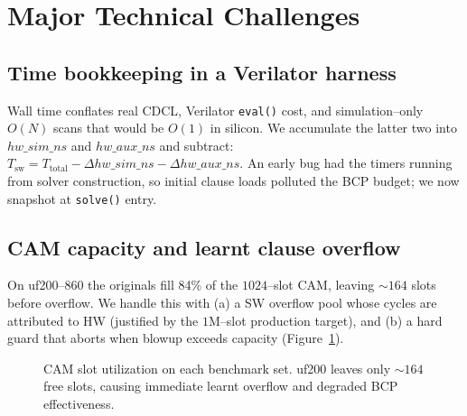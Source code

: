 \documentclass[11pt,letterpaper]{article}
\begin{document}
\section{Major Technical Challenges}

\subsection{Time bookkeeping in a Verilator harness}
Wall time conflates real CDCL, Verilator \texttt{eval()} cost, and
simulation--only $O(N)$ scans that would be $O(1)$ in silicon. We
accumulate the latter two into $hw\_sim\_ns$ and $hw\_aux\_ns$ and
subtract:
$T_{\mathrm{sw}} = T_{\mathrm{total}} - \Delta hw\_sim\_ns - \Delta hw\_aux\_ns$.
An early bug had the timers running from solver construction, so
initial clause loads polluted the BCP budget; we now snapshot at
\texttt{solve()} entry.

\subsection{CAM capacity and learnt clause overflow}
On uf200--860 the originals fill 84\% of the $1024$--slot CAM, leaving
$\sim$$164$ slots before overflow. We handle this with (a) a SW
overflow pool whose cycles are attributed to HW (justified by the
$1$M--slot production target), and (b) a hard guard that aborts when
blowup exceeds capacity (Figure~\ref{fig:blowup}).

\begin{figure}[h]
\centering
{}
\caption{CAM slot utilization on each benchmark set. uf200 leaves only
$\sim$$164$ free slots, causing immediate learnt overflow and
degraded BCP effectiveness.}
\label{fig:blowup}
\end{figure}
\end{document}

